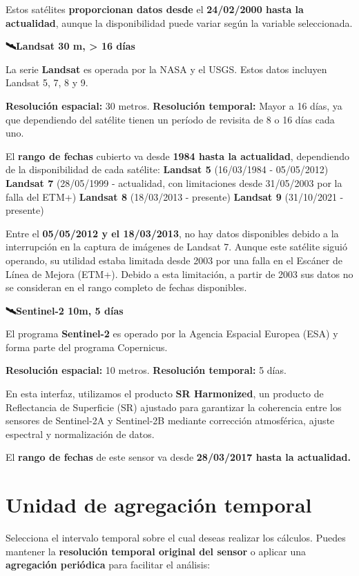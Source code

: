 \documentclass[
]{book}
\begin{document}
Estos satélites \textbf{proporcionan datos desde} el \textbf{24/02/2000 hasta la actualidad}, aunque la disponibilidad puede variar según la variable seleccionada.

\textbf{🛰️Landsat 30 m, \textgreater{} 16 días}

La serie \textbf{Landsat} es operada por la NASA y el USGS. Estos datos incluyen Landsat 5, 7, 8 y 9.

\textbf{Resolución espacial:} 30 metros.
\textbf{Resolución temporal:} Mayor a 16 días, ya que dependiendo del satélite tienen un período de revisita de 8 o 16 días cada uno.

El \textbf{rango de fechas} cubierto va desde \textbf{1984 hasta la actualidad}, dependiendo de la disponibilidad de cada satélite:
\textbf{Landsat 5} (16/03/1984 - 05/05/2012)
\textbf{Landsat 7} (28/05/1999 - actualidad, con limitaciones desde 31/05/2003 por la falla del ETM+)
\textbf{Landsat 8} (18/03/2013 - presente)
\textbf{Landsat 9} (31/10/2021 - presente)

Entre el \textbf{05/05/2012 y el 18/03/2013}, no hay datos disponibles debido a la interrupción en la captura de imágenes de Landsat 7. Aunque este satélite siguió operando, su utilidad estaba limitada desde 2003 por una falla en el Escáner de Línea de Mejora (ETM+). Debido a esta limitación, a partir de 2003 sus datos no se consideran en el rango completo de fechas disponibles.

\textbf{🛰️Sentinel-2 10m, 5 días}

El programa \textbf{Sentinel-2} es operado por la Agencia Espacial Europea (ESA) y forma parte del programa Copernicus.

\textbf{Resolución espacial:} 10 metros.
\textbf{Resolución temporal:} 5 días.

En esta interfaz, utilizamos el producto \textbf{SR Harmonized}, un producto de Reflectancia de Superficie (SR) ajustado para garantizar la coherencia entre los sensores de Sentinel-2A y Sentinel-2B mediante corrección atmosférica, ajuste espectral y normalización de datos.

El \textbf{rango de fechas} de este sensor va desde \textbf{28/03/2017 hasta la actualidad.}

\chapter{Unidad de agregación temporal}\label{ud-agregacion-temporal}

Selecciona el intervalo temporal sobre el cual deseas realizar los cálculos. Puedes mantener la \textbf{resolución temporal original del sensor} o aplicar una \textbf{agregación periódica} para facilitar el análisis:
\end{document}
